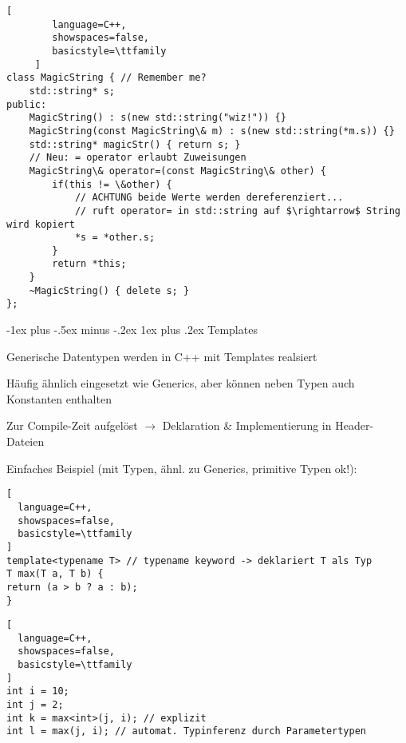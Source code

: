 \documentclass[10pt]{article}
\makeatletter
\renewcommand{\subsubsection}{\@startsection{subsubsection}{3}{0mm}%
                                {-1ex plus -.5ex minus -.2ex}%
                                {1ex plus .2ex}%
                                {\normalfont\small\bfseries}}
\makeatother
\begin{document}
\begin{lstlisting}[
        language=C++,
        showspaces=false,
        basicstyle=\ttfamily
     ]
class MagicString { // Remember me?
    std::string* s;
public:
    MagicString() : s(new std::string("wiz!")) {}
    MagicString(const MagicString\& m) : s(new std::string(*m.s)) {}
    std::string* magicStr() { return s; }
    // Neu: = operator erlaubt Zuweisungen
    MagicString\& operator=(const MagicString\& other) {
        if(this != \&other) {
            // ACHTUNG beide Werte werden dereferenziert...
            // ruft operator= in std::string auf $\rightarrow$ String wird kopiert
            *s = *other.s;
        }
        return *this;
    }
    ~MagicString() { delete s; }
};
\end{lstlisting}


\subsubsection{Templates}
\begin{itemize*}
  \item Generische Datentypen werden in C++ mit Templates realsiert
  \item Häufig ähnlich eingesetzt wie Generics, aber können neben Typen auch Konstanten enthalten
  \item Zur Compile-Zeit aufgelöst $\rightarrow$ Deklaration \& Implementierung in Header-Dateien
  \item Einfaches Beispiel (mit Typen, ähnl. zu Generics, primitive Typen ok!):
\end{itemize*}

\begin{lstlisting}[
  language=C++,
  showspaces=false,
  basicstyle=\ttfamily
]
template<typename T> // typename keyword -> deklariert T als Typ
T max(T a, T b) {
return (a > b ? a : b);
}
\end{lstlisting}

\begin{lstlisting}[
  language=C++,
  showspaces=false,
  basicstyle=\ttfamily
]
int i = 10;
int j = 2;
int k = max<int>(j, i); // explizit
int l = max(j, i); // automat. Typinferenz durch Parametertypen
\end{lstlisting}
\end{document}

